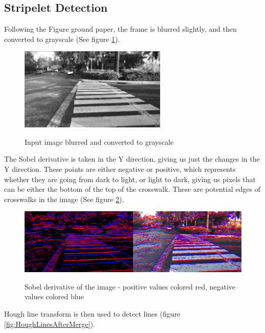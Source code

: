 \documentclass[12pt]{ucthesis}
\newcommand{\captionfonts}{\small\bf\ssp}
\begin{document}
\subsection{Stripelet Detection}

Following the Figure ground paper, the frame is blurred slightly, and then converted to grayscale (See figure \ref{fig:SlightlyBlurred}). 

\begin{figure}[h]
\begin{center}
\includegraphics[width=7cm]{SlightlyBlurredInput.png}
\captionfonts
\caption[This is a figure]{Input image blurred and converted to grayscale}
\label{fig:SlightlyBlurred}
\end{center}
\end{figure}

The Sobel derivative is taken in the Y direction, giving us just the changes in the Y direction. These points are either negative or positive, which represents whether they are going from dark to light, or light to dark, giving us pixels that can be either the bottom of the top of the crosswalk. These are potential edges of crosswalks in the image (See figure \ref{fig:TopAndBottomSobel}). 

\begin{figure}[h]
\begin{center}
\includegraphics[width=14cm]{TopAndBottomSobel.png}
\captionfonts
\caption[This is a figure]{Sobel derivative of the image - positive values colored red, negative values colored blue}
\label{fig:TopAndBottomSobel}
\end{center}
\end{figure}

Hough line transform is then used to detect lines (figure \ref{fig:HoughLinesAfterMerge}). 
\end{document}
